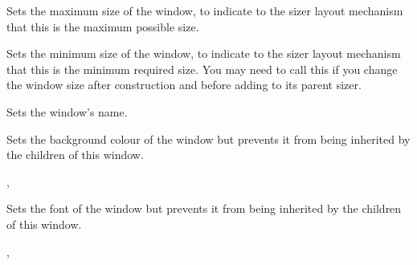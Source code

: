 

\label{wxwindowsetmaxsize}


Sets the maximum size of the window, to indicate to the sizer layout mechanism
that this is the maximum possible size.

\label{wxwindowsetminsize}


Sets the minimum size of the window, to indicate to the sizer layout mechanism
that this is the minimum required size. You may need to call this
if you change the window size after construction and before adding
to its parent sizer.

\label{wxwindowsetname}


Sets the window's name.






\label{wxwindowsetownbackgroundcolour}


Sets the background colour of the window but prevents it from being inherited
by the children of this window.


,\rtfsp
{}


\label{wxwindowsetownfont}


Sets the font of the window but prevents it from being inherited by the
children of this window.


,\rtfsp
{}


